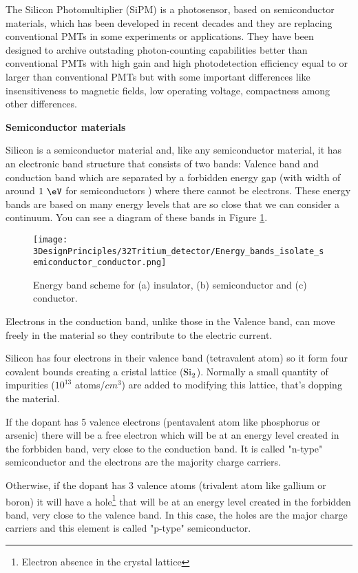 The Silicon Photomultiplier (SiPM) is a photosensor, based on semiconductor materials, which has been developed in recent decades and they are replacing conventional PMTs in some experiments or applications. They have been designed to archive outstading photon-counting capabilities better than conventional PMTs with high gain and high photodetection efficiency equal to or larger than conventional PMTs but with some important differences like insensitiveness to magnetic fields, low operating voltage, compactness among other differences.

\textbf{Semiconductor materials} 

Silicon is a semiconductor material and, like any semiconductor material, it has an electronic band structure that consists of two bands: Valence band and conduction band which are separated by a forbidden energy gap (with width of around $1~\eV$ for semiconductors \cite{Leo}) where there cannot be electrons. These energy bands are based on many energy levels that are so close that we can consider a continuum. You can see a diagram of these bands in Figure \ref{fig:EnergyBandsSC}.

\begin{figure}[htbp]
\centering
\texttt{[image: 3DesignPrinciples/32Tritium\_detector/Energy\_bands\_isolate\_semiconductor\_conductor.png]}
\caption{Energy band scheme for (a) insulator, (b) semiconductor and (c) conductor.\label{fig:EnergyBandsSC}~\cite{Leo}}
\end{figure}

Electrons in the conduction band, unlike those in the Valence band, can move freely in the material so they contribute to the electric current. 

Silicon has four electrons in their valence band (tetravalent atom) so it form four covalent bounds creating a cristal lattice ($\ce{Si_2}$). Normally a small quantity of impurities ($10^{13}$ atoms/$cm^3$) are added to modifying this lattice, that's dopping the material. 

If the dopant has 5 valence electrons (pentavalent atom like phosphorus or arsenic) there will be a free electron which will be at an energy level created in the forbbiden band, very close to the conduction band. It is called "n-type" semiconductor and the electrons are the majority charge carriers.

Otherwise, if the dopant has 3 valence atoms (trivalent atom like gallium or boron) it will have a hole\footnote{Electron absence in the crystal lattice} that will be at an energy level created in the forbidden band, very close to the valence band. In this case, the holes are the major charge carriers and this element is called "p-type" semiconductor.

